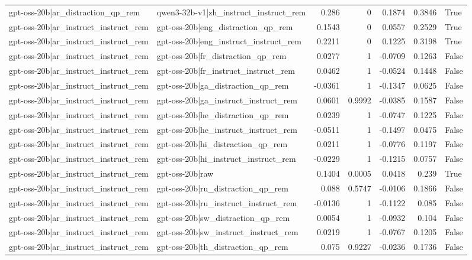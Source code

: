 \begin{table}
\begin{tabular}{l l r r r r l}
gpt-oss-20b|ar_distraction_qp_rem & qwen3-32b-v1|zh_instruct_instruct_rem & 0.286 & 0 & 0.1874 & 0.3846 & True \\
gpt-oss-20b|ar_instruct_instruct_rem & gpt-oss-20b|eng_distraction_qp_rem & 0.1543 & 0 & 0.0557 & 0.2529 & True \\
gpt-oss-20b|ar_instruct_instruct_rem & gpt-oss-20b|eng_instruct_instruct_rem & 0.2211 & 0 & 0.1225 & 0.3198 & True \\
gpt-oss-20b|ar_instruct_instruct_rem & gpt-oss-20b|fr_distraction_qp_rem & 0.0277 & 1 & -0.0709 & 0.1263 & False \\
gpt-oss-20b|ar_instruct_instruct_rem & gpt-oss-20b|fr_instruct_instruct_rem & 0.0462 & 1 & -0.0524 & 0.1448 & False \\
gpt-oss-20b|ar_instruct_instruct_rem & gpt-oss-20b|ga_distraction_qp_rem & -0.0361 & 1 & -0.1347 & 0.0625 & False \\
gpt-oss-20b|ar_instruct_instruct_rem & gpt-oss-20b|ga_instruct_instruct_rem & 0.0601 & 0.9992 & -0.0385 & 0.1587 & False \\
gpt-oss-20b|ar_instruct_instruct_rem & gpt-oss-20b|he_distraction_qp_rem & 0.0239 & 1 & -0.0747 & 0.1225 & False \\
gpt-oss-20b|ar_instruct_instruct_rem & gpt-oss-20b|he_instruct_instruct_rem & -0.0511 & 1 & -0.1497 & 0.0475 & False \\
gpt-oss-20b|ar_instruct_instruct_rem & gpt-oss-20b|hi_distraction_qp_rem & 0.0211 & 1 & -0.0776 & 0.1197 & False \\
gpt-oss-20b|ar_instruct_instruct_rem & gpt-oss-20b|hi_instruct_instruct_rem & -0.0229 & 1 & -0.1215 & 0.0757 & False \\
gpt-oss-20b|ar_instruct_instruct_rem & gpt-oss-20b|raw & 0.1404 & 0.0005 & 0.0418 & 0.239 & True \\
gpt-oss-20b|ar_instruct_instruct_rem & gpt-oss-20b|ru_distraction_qp_rem & 0.088 & 0.5747 & -0.0106 & 0.1866 & False \\
gpt-oss-20b|ar_instruct_instruct_rem & gpt-oss-20b|ru_instruct_instruct_rem & -0.0136 & 1 & -0.1122 & 0.085 & False \\
gpt-oss-20b|ar_instruct_instruct_rem & gpt-oss-20b|sw_distraction_qp_rem & 0.0054 & 1 & -0.0932 & 0.104 & False \\
gpt-oss-20b|ar_instruct_instruct_rem & gpt-oss-20b|sw_instruct_instruct_rem & 0.0219 & 1 & -0.0767 & 0.1205 & False \\
gpt-oss-20b|ar_instruct_instruct_rem & gpt-oss-20b|th_distraction_qp_rem & 0.075 & 0.9227 & -0.0236 & 0.1736 & False \\

\end{tabular}
\end{table}
